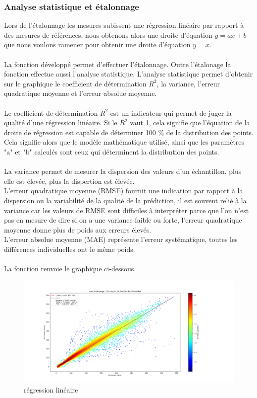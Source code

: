 \documentclass[12pt,a4paper]{article}
\begin{document}
\begin{flushleft}
\subsubsection{Analyse statistique et étalonnage}

Lors de l'étalonnage les mesures subissent une régression linéaire par rapport à des mesures de références, nous obtenons alors une droite d'équation $y = ax + b$ que nous voulons ramener pour obtenir une droite d'équation $y = x$.\\
~\\
La fonction développé permet d'effectuer l'étalonnage. Outre l'étalonage la fonction effectue aussi l'analyse statistique. L'analyse statistique permet d'obtenir sur le graphique le coefficient de détermination $R^2$, la variance, l'erreur quadratique moyenne et l'erreur absolue moyenne.\\
~\\
Le coefficient de détermination $R^2$ est un indicateur qui permet de juger la qualité d’une régression linéaire. Si le $R^2$ vaut 1, cela signifie que l’équation de la droite de régression est capable de déterminer 100 \% de la distribution des points. Cela signifie alors que le modèle mathématique utilisé, ainsi que les paramètres "a" et "b" calculés sont ceux qui déterminent la distribution des points.\\
~~\\
La variance permet de mesurer la dispersion des valeurs d'un échantillon, plus elle est élevée, plus la dispertion est élevée.
~~\\
L'erreur quadratique moyenne (RMSE) fournit une indication par rapport à la dispersion ou la variabilité de la qualité de la prédiction, il est souvent relié à la variance car les valeurs de RMSE sont difficiles à interpréter parce que l’on n'est pas en mesure de dire si on a une variance faible ou forte, l'erreur quadratique moyenne donne plus de poids aux erreurs élevés.
~\\ 

L'erreur absolue moyenne (MAE) représente l'erreur systématique, toutes les différences individuelles ont le même poids.\\
~\\
La fonction renvoie le graphique ci-dessous.

\begin{figure}[H]
\centering
\includegraphics[width=15cm]{image/etallonnage/1.png} 
\caption{régression linéaire}  
\end{figure}


\end{flushleft}
\end{document}
